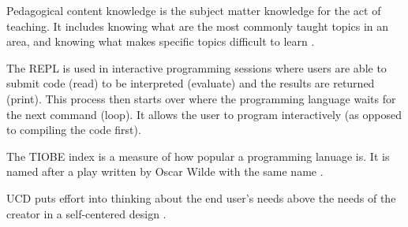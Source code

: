 \documentclass[../main.tex]{subfiles}
\begin{document}
  Pedagogical content knowledge is the subject matter knowledge for the act of teaching.
  It includes knowing what are the most commonly taught topics in an area,
  and knowing what makes specific topics difficult to learn
  \cite{shulmanThoseWhoUnderstand1986}.



  The REPL is used in interactive programming sessions where users are able to
  submit code (read) to be interpreted (evaluate) and the results are returned (print).
  This process then starts over where the programming language waits for the next command (loop).
  It allows the user to program interactively (as opposed to compiling the code first).

  
  
  The TIOBE index is a measure of how popular a programming lanuage is.
  It is named after a play written by Oscar Wilde with the same name
  \cite{IndexTIOBESoftware}.



  UCD puts effort into thinking about the end user's needs above the needs of the creator in a self-centered design
  \cite{pruittPersonaLifecycleKeeping2006, tognazziniTogSoftwareDesign1748}.

\end{document}
